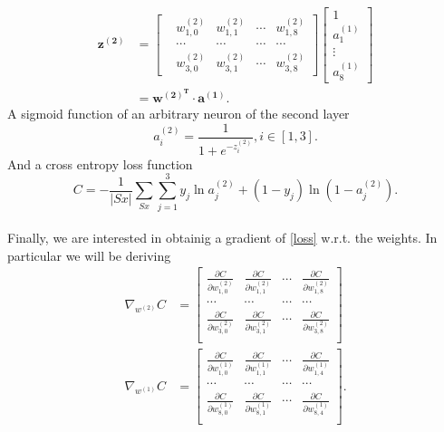 \documentclass[12pt,titlepage]{article}
\begin{document}
       \begin{equation*}
        \begin{split}
           \mathbf{z^{(2)}}&=\begin{bmatrix}
           &w_{1,0}^{(2)} &w_{1,1}^{(2)} &\cdots &w_{1,8}^{(2)} \\ 
           &\cdots &\cdots &\cdots &\cdots\\ 
           &w_{3,0}^{(2)} &w_{3,1}^{(2)} &\cdots &w_{3,8}^{(2)} 
        \end{bmatrix}
        \begin{bmatrix}
          1\\ 
          a_{1}^{(1)}\\ 
          \vdots \\ 
          a_{8}^{(1)}
       \end{bmatrix}\\
       &=\mathbf{w^{(2)^{T}}}\cdot \mathbf{a^{(1)}}.
       \end{split}
       \end{equation*}
A sigmoid function of an arbitrary neuron of the second layer \begin{equation*} a_{i}^{(2)}=\frac{1}{1+e^{-z_{i}^{(2)}}}, i \in [1,3]. \end{equation*}
And a cross entropy loss function
\begin{equation} \label{loss} C=-\frac{1}{|Sx|}\sum_{Sx}\sum_{j=1}^{3}y_{j}\ln a_{j}^{(2)} + (1-y_{j})\ln (1-a_{j}^{(2)}). \end{equation}
\\
Finally, we are interested in obtainig a gradient of \eqref{loss} w.r.t. the weights. In particular we will be deriving
\begin{align} \label{gradw2}
\nabla_{w^{(2)}}C&=\begin{bmatrix}
 \frac{\partial C}{\partial w_{1,0}^{(2)}}& \frac{\partial C}{\partial w_{1,1}^{(2)}} &\cdots &\frac{\partial C}{\partial w_{1,8}^{(2)}}\\ 
 \cdots&\cdots&\cdots&\cdots \\
 \frac{\partial C}{\partial w_{3,0}^{(2)}}& \frac{\partial C}{\partial w_{3,1}^{(2)}} &\cdots &\frac{\partial C}{\partial w_{3,8}^{(2)}}\\ 
\end{bmatrix}\\ 
\label{gradw1}
 \nabla_{w^{(1)}}C&=\begin{bmatrix}
 \frac{\partial C}{\partial w_{1,0}^{(1)}}& \frac{\partial C}{\partial w_{1,1}^{(1)}} &\cdots &\frac{\partial C}{\partial w_{1,4}^{(1)}}\\ 
 \cdots&\cdots&\cdots&\cdots \\
 \frac{\partial C}{\partial w_{8,0}^{(1)}}& \frac{\partial C}{\partial w_{8,1}^{(1)}} &\cdots &\frac{\partial C}{\partial w_{8,4}^{(1)}}\\ 
\end{bmatrix}.
\end{align}
\end{document}
